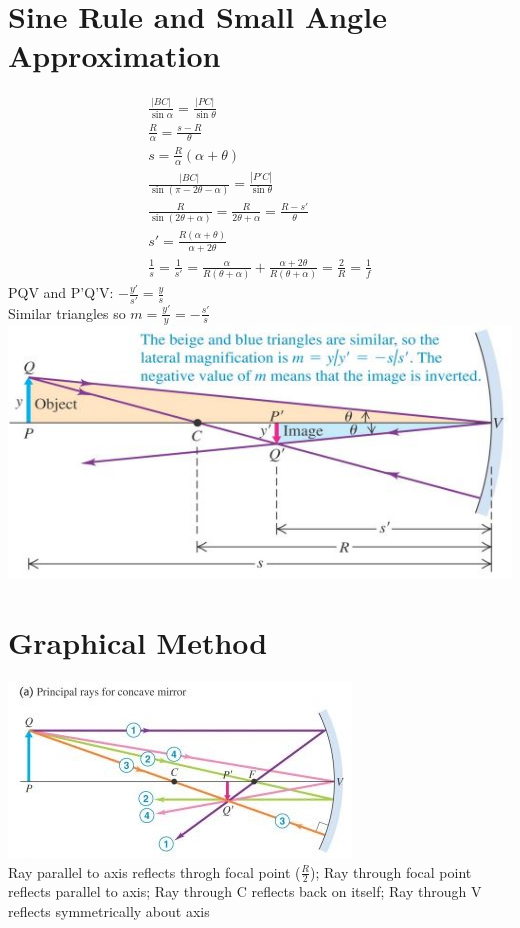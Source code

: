 \documentclass[a4paper, 11pt, fleqn, normalem]{report}
\begin{document}
\section{Sine Rule and Small Angle Approximation}
\vspace{-18pt}
\begin{gather*}
    \frac{|BC|}{\sin{\alpha}} = \frac{|PC|}{\sin{\theta}} \\
    \frac{R}{\alpha} = \frac{s - R}{\theta} \\
    s = \frac{R}{\alpha}(\alpha + \theta) \\
    \frac{|BC|}{\sin{(\pi - 2\theta - \alpha)}} = \frac{|P'C|}{\sin{\theta}}\\
    \frac{R}{\sin{(2\theta + \alpha)}} = \frac{R}{2\theta + \alpha} = \frac{R - s'}{\theta} \\
    s' = \frac{R(\alpha + \theta)}{\alpha + 2\theta} \\
    \frac{1}{s} = \frac{1}{s'} = \frac{\alpha}{R(\theta + \alpha)} + \frac{\alpha + 2\theta}{R(\theta + \alpha)} = \frac{2}{R} = \frac{1}{f}
\end{gather*}
PQV and P'Q'V: $-\frac{y'}{s'} = \frac{y}{s}$ \\
Similar triangles so $m = \frac{y'}{y} = -\frac{s'}{s}$ \\
\includegraphics{Reflect1.jpg}

\section{Graphical Method}
\includegraphics{Reflect2.jpg} \\
Ray parallel to axis reflects throgh focal point ($\frac{R}{2}$); Ray through focal point reflects parallel to axis; Ray through C reflects back on itself; Ray through V reflects symmetrically about axis
\end{document}
